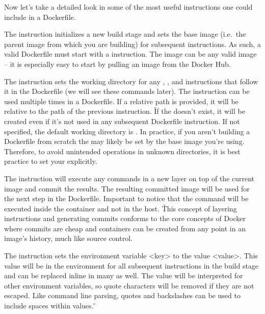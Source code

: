 Now let's take a detailed look in some of the most useful instructions one could include in a Dockerfile.
\bit
\item The  instruction initializes a new build stage and sets the base image (i.e.\ the parent image from
which you are building) for subsequent instructions. As such, a valid Dockerfile must start with a 
instruction. The image can be any valid image – it is especially easy to start by pulling an image from the Docker Hub.
\item The  instruction sets the working directory for any , , and 
instructions that follow it in the Dockerfile (we will see these commands later). The  instruction can
be used multiple times in a Dockerfile. If a relative path is provided, it will be relative to the path of the
previous  instruction. \v

If the  doesn't exist, it will be created even if it’s not used in any subsequent Dockerfile
instruction. If not specified, the default working directory is \code{/}. In practice, if you aren’t building a
Dockerfile from scratch the  may likely be set by the base image you’re using. Therefore, to avoid
unintended operations in unknown directories, it is best practice to set your  explicitly.
\item The  instruction will execute any commands in a new layer on top of the current image and commit the
results. The resulting committed image will be used for the next step in the Dockerfile. Important to notice that the
command will be executed inside the container and not in the host. \v

This concept of layering  instructions and generating commits conforms to the core concepts of Docker where
commits are cheap and containers can be created from any point in an image’s history, much like source control.
\item The  instruction sets the environment variable <key> to the value <value>. This value will be in the
environment for all subsequent instructions in the build stage and can be replaced inline in many as well. The value
will be interpreted for other environment variables, so quote characters will be removed if they are not escaped.
Like command line parsing, quotes and backslashes can be used to include spaces within values. \v

